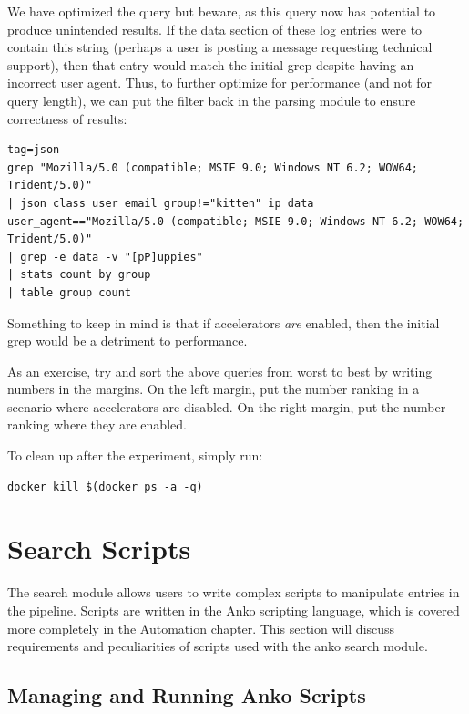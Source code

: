 We have optimized the query but beware, as this query now has
potential to produce unintended results. If the data section of these
log entries were to contain this  string (perhaps a user is
posting a message requesting technical support), then that entry would
match the initial grep despite having an incorrect user agent. Thus, to
further optimize for performance (and not for query length), we can put
the filter back in the parsing module to ensure correctness of results:

\begin{Verbatim}[breaklines=true]
tag=json 
grep "Mozilla/5.0 (compatible; MSIE 9.0; Windows NT 6.2; WOW64; Trident/5.0)" 
| json class user email group!="kitten" ip data 
user_agent=="Mozilla/5.0 (compatible; MSIE 9.0; Windows NT 6.2; WOW64; Trident/5.0)" 
| grep -e data -v "[pP]uppies" 
| stats count by group 
| table group count
\end{Verbatim}

Something to keep in mind is that if accelerators \emph{are} enabled, then the
initial grep would be a detriment to performance.

As an exercise, try and sort the above queries from worst to best by
writing numbers in the margins. On the left margin, put the number
ranking in a scenario where accelerators are disabled. On the right
margin, put the number ranking where they are enabled.

To clean up after the experiment, simply run:

\begin{Verbatim}[breaklines=true]
docker kill $(docker ps -a -q)
\end{Verbatim}



\section{Search Scripts}

The  search module allows users to write complex scripts to
manipulate entries in the pipeline. Scripts are written in the Anko
scripting language, which is covered more completely in the Automation
chapter. This section will discuss requirements and peculiarities of
scripts used with the anko search module.

\subsection{Managing and Running Anko Scripts}

